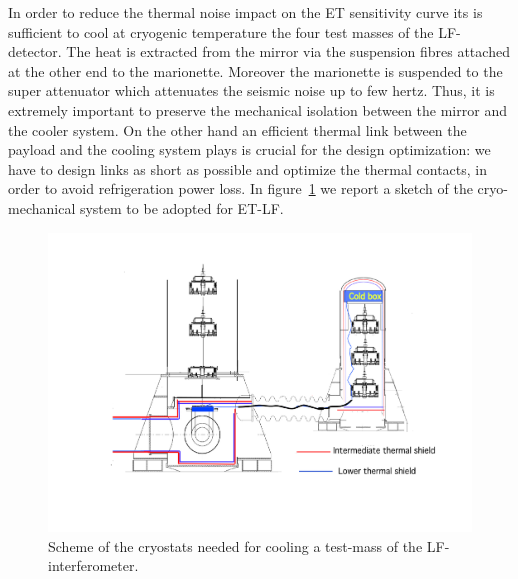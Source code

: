 In order to reduce the thermal noise impact on the ET sensitivity curve its is sufficient  to cool at cryogenic temperature the four  test masses of the LF- detector. The heat is extracted from the mirror via the suspension fibres attached at the other end to the marionette.  Moreover  the marionette is suspended to the super attenuator which attenuates the seismic noise up to few hertz. Thus,  it is extremely important to preserve the mechanical isolation between the mirror and the cooler system. On the other hand   an efficient  thermal link between
the payload and the cooling system plays is crucial for  the design optimization: we have to 
design  links as short as possible and optimize the  thermal contacts,  in order to avoid 
refrigeration power loss. 
In figure~\ref{fig:cryo_infrastructure_figure/ET_main-cryostat} we report a sketch of the cryo-mechanical system to be adopted for ET-LF.


\begin{figure}[t!]
	\begin{center}
		\includegraphics[width=17cm]{./Sec_SiteInfra/Figures/ET_main-cryostat.pdf}
		\caption{Scheme of the cryostats needed for cooling a test-mass of the LF-interferometer.}
		\label{fig:cryo_infrastructure_figure/ET_main-cryostat}
	\end{center}
\end{figure}


